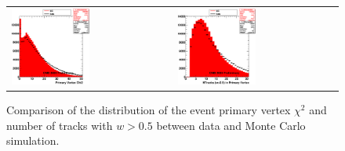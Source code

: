 \begin{figure}[h]
 \centering
 \begin{tabular}{ll}
\includegraphics[width=0.5\textwidth]{plots_EventSelection/h_AllVertexChi2.eps}&
\includegraphics[width=0.5\textwidth]{plots_EventSelection/h_AllVertexNtrk.eps}\\
 \end{tabular}
\caption{Comparison of the distribution of the event primary vertex
  $\chi^2$ and number of tracks with $w>0.5$ between data and Monte Carlo simulation. }
\label{fig:vertex_selection_2}
\end{figure}


